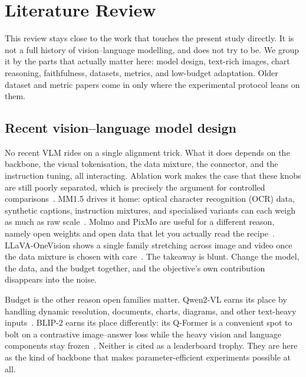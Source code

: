 \documentclass[preprint,12pt]{elsarticle}
\begin{document}
\section{Literature Review}
This review stays close to the work that touches the present study directly.
It is not a full history of vision--language modelling, and does not try to be.
We group it by the parts that actually matter here: model design, text-rich images, chart reasoning, faithfulness, datasets, metrics, and low-budget adaptation.
Older dataset and metric papers come in only where the experimental protocol leans on them.

\subsection{Recent vision--language model design}
No recent VLM rides on a single alignment trick.
What it does depends on the backbone, the visual tokenisation, the data mixture, the connector, and the instruction tuning, all interacting.
Ablation work makes the case that these knobs are still poorly separated, which is precisely the argument for controlled comparisons~\cite{laurencon2024whatmatters}.
MM1.5 drives it home: optical character recognition (OCR) data, synthetic captions, instruction mixtures, and specialised variants can each weigh as much as raw scale~\cite{zhang2025mm15}.
Molmo and PixMo are useful for a different reason, namely open weights and open data that let you actually read the recipe~\cite{deitke2025molmo}.
LLaVA-OneVision shows a single family stretching across image and video once the data mixture is chosen with care~\cite{li2025llavaonevision}.
The takeaway is blunt.
Change the model, the data, and the budget together, and the objective's own contribution disappears into the noise.

Budget is the other reason open families matter.
Qwen2-VL earns its place by handling dynamic resolution, documents, charts, diagrams, and other text-heavy inputs~\cite{wang2024qwen2vl}.
BLIP-2 earns its place differently: its Q-Former is a convenient spot to bolt on a contrastive image--answer loss while the heavy vision and language components stay frozen~\cite{li2023blip2}.
Neither is cited as a leaderboard trophy.
They are here as the kind of backbone that makes parameter-efficient experiments possible at all.
\end{document}
